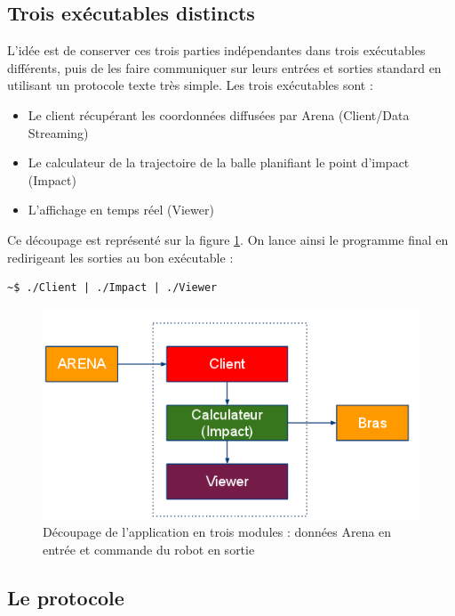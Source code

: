 \documentclass{article}[11pt]
\begin{document}
\subsection{Trois exécutables distincts}

L'idée est de conserver ces trois parties indépendantes dans trois exécutables différents, puis de les faire communiquer sur leurs entrées et sorties standard en utilisant un protocole texte très simple. Les trois exécutables sont :
\begin{itemize}
\item Le client récupérant les coordonnées diffusées par Arena (Client/Data Streaming)
\item Le calculateur de la trajectoire de la balle planifiant le point d'impact (Impact)
\item L'affichage en temps réel (Viewer) \\
\end{itemize}

Ce découpage est représenté sur la figure \ref{general}. On lance ainsi le programme final en redirigeant les sorties au bon exécutable :
\begin{verbatim}
~$ ./Client | ./Impact | ./Viewer
\end{verbatim}

\begin{figure}[!htc]
	\begin{center}
		\includegraphics[scale=0.5]{images/tout.png}
		\caption{Découpage de l'application en trois modules : données Arena en entrée et commande du robot en sortie} 
		\label{general}
	\end{center}
\end{figure}

\subsection{Le protocole}
\end{document}
